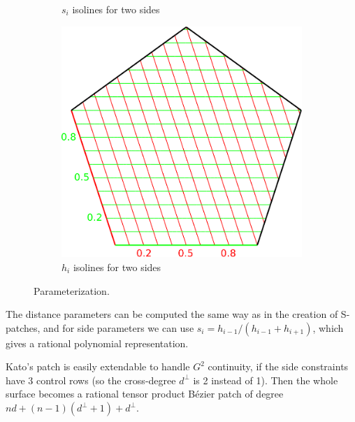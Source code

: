 \documentclass[9pt,academicons]{article}
\begin{document}
\begin{figure}[b!]
\begin{subfigure}{0.3\textwidth}
\begin{minipage}[b][5cm][b]{\textwidth}
      \vspace*{-2mm}
    \end{minipage}
    \caption{$s_i$ isolines for two sides}
    \label{fig:s}
  \end{subfigure}
  \hfill
  \begin{subfigure}{0.30\textwidth}
    \begin{minipage}[b][5cm][b]{\textwidth}
      \centering
      \includegraphics[width = \textwidth]{images/h-params.pdf}
      \vspace*{-2mm}
    \end{minipage}
    \caption{$h_i$ isolines for two sides}
    \label{fig:h}
  \end{subfigure}
  \caption{Parameterization.}
  \label{fig:parameters}
\end{figure}

The distance parameters can be computed the same way as in the creation of S-patches, and for side
parameters we can use $s_i=h_{i-1}/(h_{i-1}+h_{i+1})$, which gives a rational polynomial
representation.

Kato's patch is easily extendable to handle $G^2$ continuity, if the side constraints have 3
control rows (so the cross-degree $d^\perp$ is 2 instead of 1).
Then the whole surface becomes a rational tensor product B\'ezier patch of
degree $nd+(n-1)(d^\perp+1)+d^\perp$.
\end{document}
